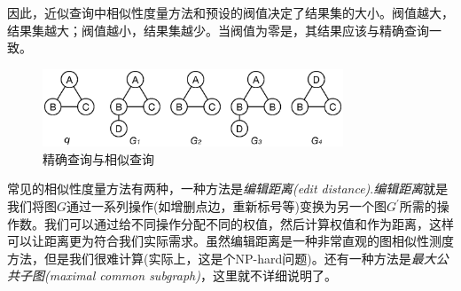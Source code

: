 \documentclass{XDBAthesis}
\begin{document}
因此，近似查询中相似性度量方法和预设的阀值决定了结果集的大小。阀值越大，结果集越大；阀值越小，结果集越少。当阀值为零是，其结果应该与精确查询一致。

\begin{figure}[htb]
    \centering
    \includegraphics[width=0.8\textwidth]{2last}
    \caption{精确查询与相似查询}
    \label{fg:simacu}
\end{figure}

常见的相似性度量方法有两种，一种方法是\emph{编辑距离(edit distance)}.\emph{编辑距离}就是我们将图$G$通过一系列操作(如增删点边，重新标号等)变换为另一个图$G^{'}$所需的操作数。我们可以通过给不同操作分配不同的权值，然后计算权值和作为距离，这样可以让距离更为符合我们实际需求。虽然编辑距离是一种非常直观的图相似性测度方法，但是我们很难计算(实际上，这是个NP-hard问题)。还有一种方法是\emph{最大公共子图(maximal common subgraph)}\cite{mcs}，这里就不详细说明了。

\ifx\allfiles\undefined


\end{document}
